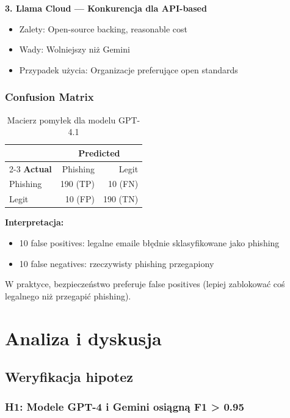 \documentclass[11pt]{extreport}
\begin{document}
\textbf{3. Llama Cloud --- Konkurencja dla API-based}
\begin{itemize}
    \item Zalety: Open-source backing, reasonable cost
    \item Wady: Wolniejszy niż Gemini
    \item Przypadek użycia: Organizacje preferujące open standards
\end{itemize}

\subsection{Confusion Matrix}

\begin{table}[H]
\centering
\caption{Macierz pomyłek dla modelu GPT-4.1}
\label{tab:confusion}
\begin{tabular}{@{}lrr@{}}
\toprule
& \multicolumn{2}{c}{\textbf{Predicted}} \\
\cmidrule(lr){2-3}
\textbf{Actual} & Phishing & Legit \\ 
\midrule
Phishing & 190 (TP) & 10 (FN) \\
Legit    & 10 (FP)  & 190 (TN) \\
\bottomrule
\end{tabular}
\end{table}

\textbf{Interpretacja:}
\begin{itemize}
    \item 10 false positives: legalne emaile błędnie sklasyfikowane jako phishing
    \item 10 false negatives: rzeczywisty phishing przegapiony
\end{itemize}

W praktyce, bezpieczeństwo preferuje false positives (lepiej zablokować coś legalnego niż przegapić phishing).

\chapter{Analiza i dyskusja}
\label{ch:dyskusja}

\section{Weryfikacja hipotez}
\label{sec:weryfikacja}

\subsection{H1: Modele GPT-4 i Gemini osiągną F1 > 0.95}
\end{document}
